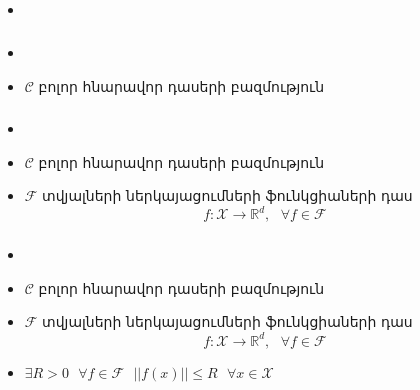 \documentclass[10pt]{beamer}
\begin{document}
\subsection{}

\begin{frame}[t]
\frametitle{}
\end{frame}

\begin{frame}[t]
\frametitle{}
\begin{itemize}
\vspace{8mm}
\item {}
\end{itemize}
\end{frame}

\begin{frame}[t]
\frametitle{}
\begin{itemize}
\vspace{8mm}
\item {}
\item $\mathcal{C}$ բոլոր հնարավոր դասերի բազմություն 
\end{itemize}
\end{frame}

\begin{frame}[t]
\frametitle{}
\begin{itemize}
\vspace{8mm}
\item {}
\item $\mathcal{C}$ բոլոր հնարավոր դասերի բազմություն 
\item $\mathcal{F}$ տվյալների ներկայացումների ֆունկցիաների դաս $$f:\mathcal{X} \rightarrow \mathbb{R}^d, \text{ }\forall f \in \mathcal{F}$$
\end{itemize}
\end{frame}


\begin{frame}[t]
\frametitle{}
\begin{itemize}
\vspace{8mm}
\item {}
\item $\mathcal{C}$ բոլոր հնարավոր դասերի բազմություն 
\item $\mathcal{F}$ տվյալների ներկայացումների ֆունկցիաների դաս $$f:\mathcal{X} \rightarrow \mathbb{R}^d, \text{ }\forall f \in \mathcal{F}$$
\item $\exists R > 0 \text{ } \forall f \in \mathcal{F} \text{ } ||f(x)|| \leq R \text{ } \forall x \in \mathcal{X}$
\end{itemize}
\end{frame}
\end{document}

